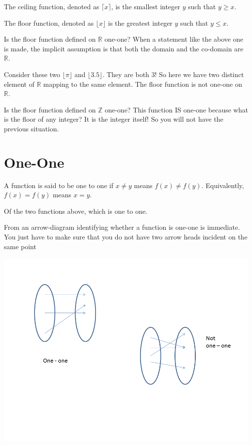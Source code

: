 \documentclass[12pt]{article}
\begin{document}
The ceiling function, denoted as $\lceil x \rceil$, is the smallest integer $y$ such that $y \ge x$. 

The floor function, denoted as $\lfloor x \rfloor$ is the greatest integer $y$ such that $y \le x$.

\medskip

Is the floor function defined on $\mathbb{R}$ one-one? 
When a statement like the above one is made, the implicit assumption is that both the domain and the co-domain are $\mathbb{R}$. 

Consider these two $\lfloor \pi \rfloor$ and $\lfloor 3.5 \rfloor$. They are both 3! So here we have two distinct element of $\mathbb{R}$ mapping to the same element. The floor function is not one-one on $\mathbb{R}$.

\medskip

Is the floor function defined on $\mathbb{Z}$ one-one?
This function IS one-one because what is the floor of any integer? It is the integer itself!
So you will not have the previous situation. 

\section*{One-One}
A function is said to be one to one if $x \neq y$ means $f(x) \neq f(y)$. Equivalently, 
$f(x) = f(y)$ means $x = y$. 

Of the two functions above, which is one to one. 

From an arrow-diagram identifying whether a function is one-one is immediate. You just have to make sure that you do not have two arrow heads incident on the same point

\includegraphics[scale=0.6]{oneone.png}
\end{document}
